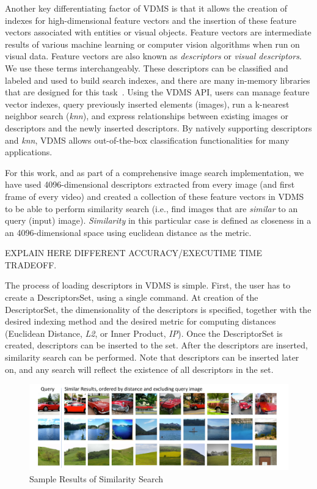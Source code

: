 Another key differentiating factor of VDMS is that it allows the creation of
indexes for high-dimensional feature vectors and the insertion of
these feature vectors associated with entities or visual objects.
Feature vectors are intermediate results of various machine
learning or computer vision algorithms when run on visual data.
Feature vectors are also known as \textit{descriptors}
or \textit{visual descriptors}. We use these terms interchangeably.
These descriptors can be classified and labeled and used to build search indexes,
and there are many in-memory libraries that are designed for
this task~\cite{flann, faiss}.
Using the VDMS API, users can manage feature vector indexes,
query previously inserted elements (images),
run a k-nearest neighbor search (\textit{knn}), and express relationships
between existing images or descriptors and
the newly inserted descriptors.
By natively supporting descriptors and \textit{knn},
VDMS allows out-of-the-box classification functionalities for many applications.

For this work, and as part of a comprehensive image search implementation,
we have used 4096-dimensional descriptors extracted from every image
(and first frame of every video) and created a collection of these feature
vectors in VDMS to be able to perform similarity search (i.e., find
images that are \textit{similar} to an query (input) image).
\textit{Similarity} in this particular case is defined as closeness
in a an 4096-dimensional space using euclidean distance as the metric.

EXPLAIN HERE DIFFERENT ACCURACY/EXECUTIME TIME TRADEOFF.

The process of loading descriptors in VDMS is simple.
First, the user has to create a DescriptorsSet, using a single command.
At creation of the DescriptorSet, the dimensionality of the descriptors
is specified, together with the desired indexing method and the desired metric
for computing distances (Euclidean Distance, \textit{L2},
or Inner Product, \textit{IP}).
Once the DescriptorSet is created, descriptors can be inserted to the set.
After the descriptors are inserted, similarity search can be performed.
Note that descriptors can be inserted later on, and any search will reflect
the existence of all descriptors in the set.

\begin{figure}[]
\centering
\includegraphics[width=\textwidth]{figures/feature_img_results}
\caption{Sample Results of Similarity Search}
\label{fig:similarity}
\end{figure}

